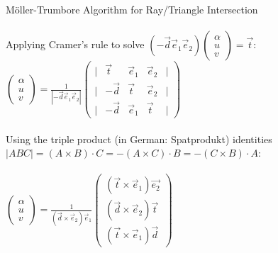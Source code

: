 \documentclass[utf8,stillsansserifmath,fleqn,t]{beamer}
\newcommand{\ds}{\displaystyle}
\begin{document}
\begin{frame}
\frametitle{\insertsection}
Möller-Trumbore Algorithm for Ray/Triangle Intersection\\~\\
Applying Cramer's rule to solve
$\ds (-\vec{d} \vec{e}_1 \vec{e}_2) \begin{pmatrix}\alpha\\u\\v\end{pmatrix} = \vec{t}$:\\
$\ds \begin{pmatrix}\alpha\\u\\v\end{pmatrix} = \frac{1}{|-\vec{d} \vec{e}_1 \vec{e}_2|}
\begin{pmatrix}|& \vec{t} & \vec{e}_1 & \vec{e}_2&|\\
               |&-\vec{d} & \vec{t}   & \vec{e}_2&|\\
               |& -\vec{d} & \vec{e}_1 & \vec{t}&|\end{pmatrix}$\\~\\
Using the triple product (in German: Spatprodukt) identities\\ $|ABC| = (A\times B)\cdot C = -(A\times C)\cdot B = - (C\times B)\cdot A$:\\~\\
$\ds \begin{pmatrix}\alpha\\u\\v\end{pmatrix} = \frac{1}{(\vec{d}\times\vec{e}_2)\vec{e}_1}
\begin{pmatrix}(\vec{t}\times \vec{e}_1)\vec{e_2}\\
               (\vec{d}\times \vec{e}_2)\vec{t}\\
               (\vec{t}\times \vec{e}_1)\vec{d}\end{pmatrix}$\\
\end{frame}
\end{document}
